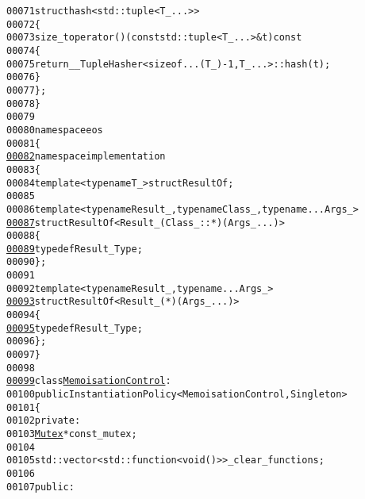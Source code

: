 \begin{footnotesize}
\begin{alltt}
00071     \textcolor{keyword}{struct }hash<std::tuple<T\_ ...>>
00072     \{
00073         \textcolor{keywordtype}{size\_t} operator() (\textcolor{keyword}{const} std::tuple<T\_ ...> & t)\textcolor{keyword}{ const}
00074 \textcolor{keyword}{        }\{
00075             \textcolor{keywordflow}{return} \_\_TupleHasher<\textcolor{keyword}{sizeof}...(T\_) - 1, T\_ ...>::hash(t);
00076         \}
00077     \};
00078 \}
00079 
00080 \textcolor{keyword}{namespace }eos
00081 \{
\hypertarget{memoise_8hh_source_l00082}{}\hyperlink{namespaceeos_1_1implementation}{00082}     \textcolor{keyword}{namespace }implementation
00083     \{
00084         \textcolor{keyword}{template} <\textcolor{keyword}{typename} T\_> \textcolor{keyword}{struct }ResultOf;
00085 
00086         \textcolor{keyword}{template} <\textcolor{keyword}{typename} Result\_, \textcolor{keyword}{typename} Class\_, \textcolor{keyword}{typename} ... Args\_>
\hypertarget{memoise_8hh_source_l00087}{}\hyperlink{structeos_1_1implementation_1_1ResultOf_3_01Result___07Class___1_1_5_08_07Args___8_8_8_08_4}{00087}         \textcolor{keyword}{struct }ResultOf<Result\_ (Class\_::*) (Args\_ ...)>
00088         \{
\hypertarget{memoise_8hh_source_l00089}{}\hyperlink{structeos_1_1implementation_1_1ResultOf_3_01Result___07Class___1_1_5_08_07Args___8_8_8_08_4_ab09033492b872695f968f4eb92917df3}{00089}             \textcolor{keyword}{typedef} Result\_ Type;
00090         \};
00091 
00092         \textcolor{keyword}{template} <\textcolor{keyword}{typename} Result\_, \textcolor{keyword}{typename} ... Args\_>
\hypertarget{memoise_8hh_source_l00093}{}\hyperlink{structeos_1_1implementation_1_1ResultOf_3_01Result___07_5_08_07Args___8_8_8_08_4}{00093}         \textcolor{keyword}{struct }ResultOf<Result\_ (*) (Args\_ ...)>
00094         \{
\hypertarget{memoise_8hh_source_l00095}{}\hyperlink{structeos_1_1implementation_1_1ResultOf_3_01Result___07_5_08_07Args___8_8_8_08_4_aee86cd65eda09566ce90b009ddfb27b9}{00095}             \textcolor{keyword}{typedef} Result\_ Type;
00096         \};
00097     \}
00098 
\hypertarget{memoise_8hh_source_l00099}{}\hyperlink{classeos_1_1MemoisationControl}{00099}     \textcolor{keyword}{class }\hyperlink{classeos_1_1MemoisationControl}{MemoisationControl} :
00100         \textcolor{keyword}{public} InstantiationPolicy<MemoisationControl, Singleton>
00101     \{
00102         \textcolor{keyword}{private}:
00103             \hyperlink{classeos_1_1Mutex}{Mutex} * \textcolor{keyword}{const} \_mutex;
00104 
00105             std::vector<std::function<void ()>> \_clear\_functions;
00106 
00107         \textcolor{keyword}{public}:

\end{alltt}
\end{footnotesize}
